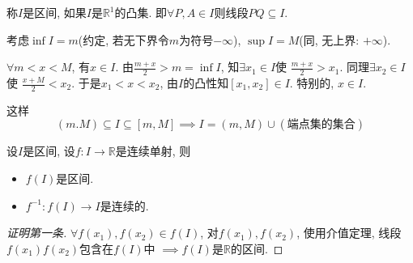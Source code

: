 
\color{black}

\begin{definition}
    称$I$是区间, 如果$I$是$\mathbb{R}^{1}$的凸集. 即$\forall P, A \in I$则线段$PQ \subseteq I$.
\end{definition}

\begin{proposition}
    考虑$\inf I = m$(约定, 若无下界令$m$为符号$-\infty$), $\sup I = M$(同, 无上界: $+\infty$).

    $\forall m < x < M$, 有$x \in I$. 由$\frac{m+x}{2} > m = \inf I$, 知$\exists x_1 \in I$使 $\frac{m+x}{2} > x_1$. 同理$\exists x_2 \in I$使 $\frac{x+M}{2} < x_2$. 于是$x_1 < x < x_2$, 由$I$的凸性知$\left[ x_1, x_2 \right]  \in I$.
    特别的, $x \in I$.

    这样
    \begin{equation}
        \left( m.M  \right) \subseteq  I \subseteq \left[ m,M \right] \implies I = \left( m, M \right) \cup \left( \text{端点集的集合} \right) 
    \end{equation} 
\end{proposition}


\begin{theorem}[反函数定理]
    设$I$是区间, 设$f \colon I \to \mathbb{R}$是连续单射, 则
    \begin{itemize}
        \item $f\left( I \right) $是区间.
        \item $f^{-1} \colon f\left( I \right) \to I$是连续的.
    \end{itemize}
\end{theorem}

\begin{proof}[证明第一条]
    $\forall f\left( x_1 \right) , f\left( x_2 \right) \in f\left( I \right) $, 对$f\left( x_1 \right) , f\left( x_2 \right) $, 使用介值定理, 线段$f\left( x_1 \right) f\left( x_2 \right) $包含在$f\left( I \right) $中 $\implies f\left( I \right)$是$\mathbb{R}$的区间.
\end{proof}

